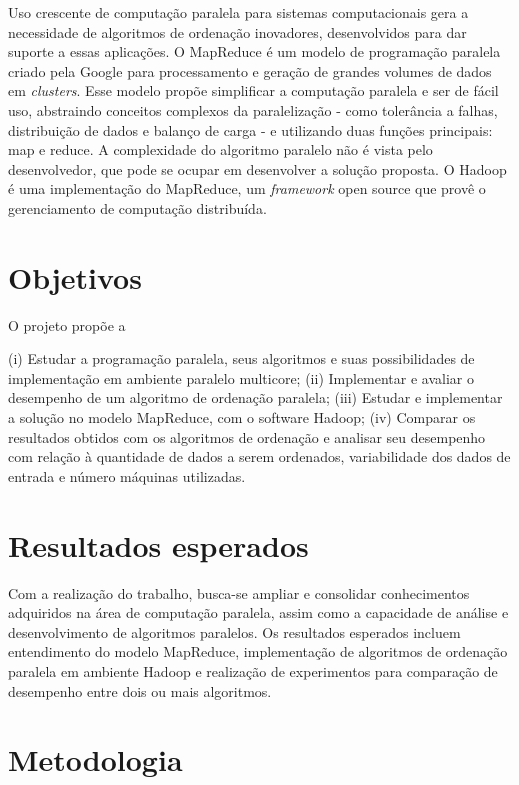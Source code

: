 Uso crescente de computação paralela para sistemas computacionais gera a necessidade de algoritmos de ordenação inovadores, desenvolvidos para dar suporte a essas aplicações. 
O MapReduce\cite{Dean:2008}  é um modelo de programação paralela criado pela Google para processamento e geração de grandes volumes de dados em \textit{clusters}. Esse modelo propõe simplificar a computação paralela e ser de fácil uso, abstraindo conceitos complexos da paralelização - como tolerância a falhas, distribuição de dados e balanço de carga - e utilizando duas funções principais: map e reduce. A complexidade do algoritmo paralelo não é vista pelo desenvolvedor, que pode se ocupar em desenvolver a solução proposta. O Hadoop \cite{Hadoop:2010} é uma implementação do MapReduce, um \textit{framework} open source que provê o gerenciamento de computação distribuída. 


\section{Objetivos}

O projeto propõe a 

(i) Estudar a programação paralela, seus algoritmos e suas possibilidades de implementação em ambiente paralelo multicore;
(ii) Implementar e avaliar o desempenho de um algoritmo de ordenação paralela;
(iii) Estudar e implementar a solução no modelo MapReduce, com o software Hadoop;
(iv) Comparar os resultados obtidos com os algoritmos de ordenação e analisar seu desempenho com relação à quantidade de dados a serem ordenados, variabilidade dos dados de entrada e número máquinas utilizadas.

\section{Resultados esperados}

Com a realização do trabalho, busca-se ampliar e consolidar conhecimentos adquiridos na área de computação paralela, assim como
a capacidade de análise e desenvolvimento de algoritmos paralelos. 
Os resultados esperados incluem entendimento do modelo MapReduce, implementação de algoritmos de ordenação paralela em ambiente Hadoop e realização de experimentos para comparação de desempenho entre dois ou mais algoritmos.  

\section{Metodologia}

